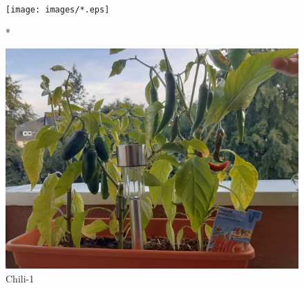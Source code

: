 %
%
%
\begin{figure}[!hb]%
    \centering
  \texttt{[image: images/*.eps]}%
  \caption{*}%
\end{figure}

%
%
\begin{figure}[!hb]%
    \centering
  \includegraphics[width=.80\textwidth]{images/Chili-1.pdf}%
  \caption{Chili-1}%
\end{figure}

